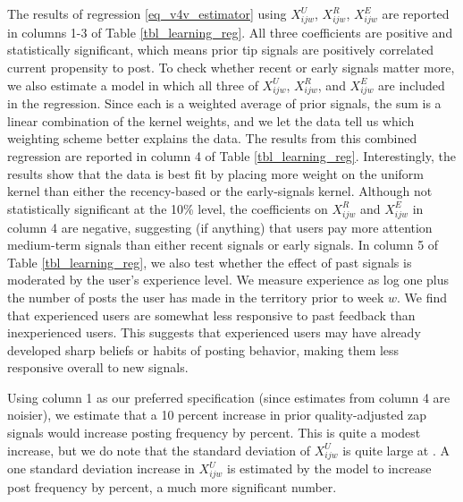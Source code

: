The results of regression \eqref{eq_v4v_estimator} using $X_{ijw}^U$, $X_{ijw}^R$, $X_{ijw}^E$ are reported in columns 1-3 of Table \ref{tbl_learning_reg}. All three coefficients are positive and statistically significant, which means prior tip signals are positively correlated current propensity to post. To check whether recent or early signals matter more, we also estimate a model in which all three of $X_{ijw}^U$, $X_{ijw}^R$, and $X_{ijw}^E$ are included in the regression. Since each is a weighted average of prior signals, the sum is a linear combination of the kernel weights, and we let the data tell us which weighting scheme better explains the data. The results from this combined regression are reported in column 4 of Table \ref{tbl_learning_reg}. Interestingly, the results show that the data is best fit by placing more weight on the uniform kernel than either the recency-based or the early-signals kernel. Although not statistically significant at the 10\% level, the coefficients on $X_{ijw}^R$ and $X_{ijw}^E$ in column 4 are negative, suggesting (if anything) that users pay more attention medium-term signals than either recent signals or early signals. In column 5 of Table \ref{tbl_learning_reg}, we also test whether the effect of past signals is moderated by the user's experience level. We measure experience as log one plus the number of posts the user has made in the territory prior to week $w$. We find that experienced users are somewhat less responsive to past feedback than inexperienced users. This suggests that experienced users may have already developed sharp beliefs or habits of posting behavior, making them less responsive overall to new signals.

Using column 1 as our preferred specification (since estimates from column 4 are noisier), we estimate that a 10 percent increase in prior quality-adjusted zap signals would increase posting frequency by  percent. This is quite a modest increase, but we do note that the standard deviation of $X_{ijw}^U$ is quite large at . A one standard deviation increase in $X_{ijw}^U$ is estimated by the model to increase post frequency by  percent, a much more significant number.

~

